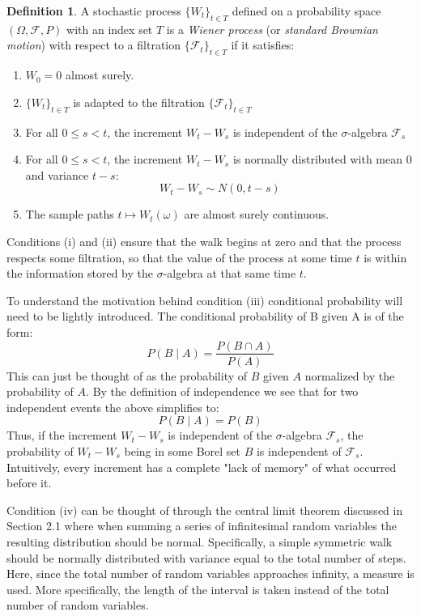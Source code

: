 \documentclass[12pt]{article}
\theoremstyle{definition}
\newtheorem{definition}{Definition}[section]
\theoremstyle{plain}
\theoremstyle{remark}
\begin{document}
\begin{definition}
A stochastic process $\{W_t\}_{t \in T}$ defined on a probability space $(\Omega, \mathcal{F}, P)$ with an index set $T$ is a \textit{Wiener process} (or \textit{standard Brownian motion}) with respect to a filtration $\{\mathcal{F}_t\}_{t \in T}$ if it satisfies:
\begin{enumerate}[label=(\roman*)]
\item $W_0 = 0$ almost surely.
\item $\{W_t\}_{t \in T}$ is adapted to the filtration $\{\mathcal{F}_t\}_{t \in T}$
\item For all $0 \leq s < t$, the increment $W_t - W_s$ is independent of the $\sigma$-algebra $\mathcal{F}_s$
\item For all $0 \leq s < t$, the increment $W_t - W_s$ is normally distributed with mean $0$ and variance $t-s$:
\[
W_t - W_s \sim N(0, t-s)
\]
\item The sample paths $t \mapsto W_t(\omega)$ are almost surely continuous.
\end{enumerate}
\end{definition}

Conditions (i) and (ii) ensure that the walk begins at zero and that the process respects some filtration, so that the value of the process at some time $t$ is within the information stored by the $\sigma$-algebra at that same time $t$.  

To understand the motivation behind condition (iii) conditional probability will need to be lightly introduced.  The conditional probability of B given A is of the form:
\[
P(B \mid A) = \frac{P(B \cap A)}{P(A)}
\]
This can just be thought of as the probability of $B$ given $A$ normalized by the probability of $A$.  By the definition of independence we see that for two independent events the above simplifies to:
\[
P(B \mid A) = P(B)
\]
Thus, if the increment $W_t - W_s$ is independent of the $\sigma$-algebra $\mathcal{F}_s$, the probability of $W_t - W_s$ being in some Borel set $B$ is independent of $\mathcal{F}_s$.  Intuitively, every increment has a complete "lack of memory" of what occurred before it.  

Condition (iv) can be thought of through the central limit theorem discussed in Section 2.1 where when summing a series of infinitesimal random variables the resulting distribution should be normal.  Specifically, a simple symmetric walk should be normally distributed with variance equal to the total number of steps.  Here, since the total number of random variables approaches infinity, a measure is used.  More specifically, the length of the interval is taken instead of the total number of random variables.  
\end{document}
